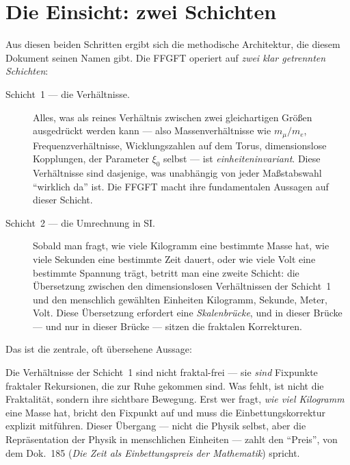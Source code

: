 \section{Die Einsicht: zwei Schichten}

Aus diesen beiden Schritten ergibt sich die methodische Architektur, die
diesem Dokument seinen Namen gibt. Die FFGFT operiert auf \emph{zwei klar
getrennten Schichten}:

\begin{description}
  \item[Schicht~1 --- die Verhältnisse.] Alles, was als reines Verhältnis
    zwischen zwei gleichartigen Größen ausgedrückt werden kann --- also
    Massenverhältnisse wie $m_{\mu}/m_{e}$, Frequenzverhältnisse,
    Wicklungszahlen auf dem Torus, dimensionslose Kopplungen, der Parameter
    $\xi_{0}$ selbst --- ist \emph{einheiteninvariant}. Diese Verhältnisse
    sind dasjenige, was unabhängig von jeder Maßstabswahl ``wirklich da''
    ist. Die FFGFT macht ihre fundamentalen Aussagen auf dieser Schicht.

  \item[Schicht~2 --- die Umrechnung in SI.] Sobald man fragt, wie viele
    Kilogramm eine bestimmte Masse hat, wie viele Sekunden eine bestimmte
    Zeit dauert, oder wie viele Volt eine bestimmte Spannung trägt, betritt
    man eine zweite Schicht: die Übersetzung zwischen den dimensionslosen
    Verhältnissen der Schicht~1 und den menschlich gewählten Einheiten
    Kilogramm, Sekunde, Meter, Volt. Diese Übersetzung erfordert eine
    \emph{Skalenbrücke}, und in dieser Brücke --- und nur in dieser Brücke
    --- sitzen die fraktalen Korrekturen.
\end{description}

Das ist die zentrale, oft übersehene Aussage:

\begin{center}
\end{center}

Die Verhältnisse der Schicht~1 sind nicht fraktal-frei --- sie
\emph{sind} Fixpunkte fraktaler Rekursionen, die zur Ruhe gekommen
sind. Was fehlt, ist nicht die Fraktalität, sondern ihre sichtbare
Bewegung. Erst wer fragt, \emph{wie viel Kilogramm} eine Masse hat,
bricht den Fixpunkt auf und muss die Einbettungskorrektur explizit
mitführen. Dieser Übergang --- nicht die Physik selbst, aber die
Repräsentation der Physik in menschlichen Einheiten --- zahlt den
``Preis'', von dem Dok.~185 (\emph{Die Zeit als Einbettungspreis der
Mathematik}) spricht.

